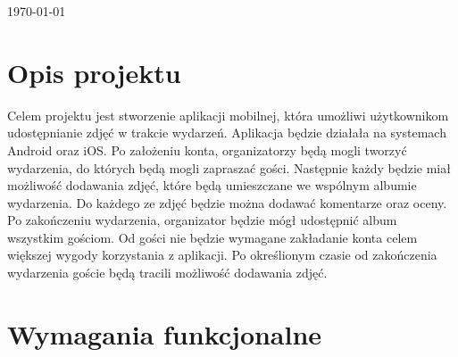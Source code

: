 \begin{titlepage}




    \vfill\vfill\vfill %

    {\large\today} %

    \vfill %

\end{titlepage}

\newpage

\section{Opis projektu}

Celem projektu jest stworzenie aplikacji mobilnej, która umożliwi użytkownikom udostępnianie zdjęć w trakcie wydarzeń. Aplikacja będzie działała na systemach Android oraz iOS. Po założeniu konta, organizatorzy będą mogli tworzyć wydarzenia, do których będą mogli zapraszać gości. Następnie każdy będzie miał możliwość dodawania zdjęć, które będą umieszczane we wspólnym albumie wydarzenia. Do każdego ze zdjęć będzie można dodawać komentarze oraz oceny. Po zakończeniu wydarzenia, organizator będzie mógł udostępnić album wszystkim gościom. Od gości nie będzie wymagane zakładanie konta celem większej wygody korzystania z aplikacji. Po określionym czasie od zakończenia wydarzenia goście będą tracili możliwość dodawania zdjęć.

\section{Wymagania funkcjonalne}

